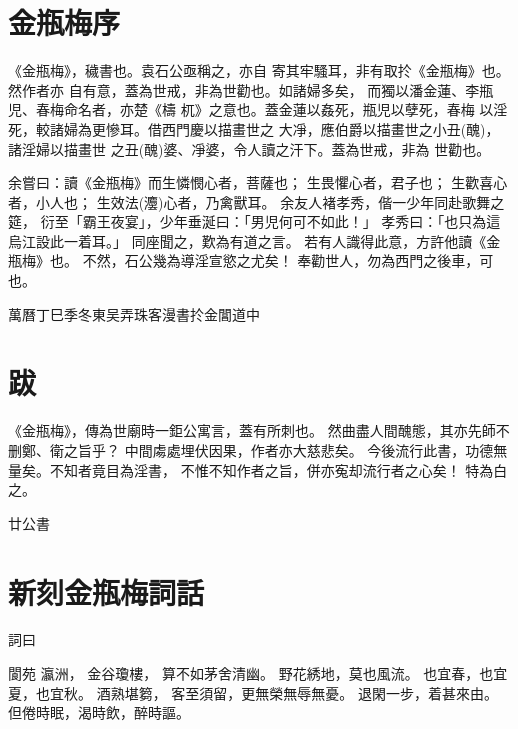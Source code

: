 \chapter*{金瓶梅序}

《金瓶梅》，穢書也。袁石公亟稱之，亦自
寄其牢騷耳，非有取扵《金瓶梅》也。然作者亦
自有意，蓋為世戒，非為世勸也。如諸婦多矣，
而獨以潘金蓮、李瓶児、春梅命名者，亦楚《檮
杌》之意也。蓋金蓮以姦死，瓶児以孽死，春梅
以淫死，較諸婦為更慘耳。借西門慶以描畫世之
大凈，應伯爵以描畫世之小丑(醜)，諸淫婦以描畫世
之丑(醜)婆、凈婆，令人讀之汗下。蓋為世戒，非為
世勸也。

余嘗曰：讀《金瓶梅》而生憐憫心者，菩薩也；
生畏懼心者，君子也；
生歡喜心者，小人也；
生效法(灋)心者，乃禽獸耳。
余友人褚孝秀，偕一少年同赴歌舞之筵，
衍至「霸王夜宴」，少年垂涎曰：「男児何可不如此！」
孝秀曰：「也只為這烏江設此一着耳。」
同座聞之，歎為有道之言。
若有人識得此意，方許他讀《金瓶梅》也。
不然，石公幾為導淫宣慾之尤矣！
奉勸世人，勿為西門之後車，可也。

{\bigskip\mbox{}\fzqiti\large\hfill 萬曆丁巳季冬東吴弄珠客漫書扵金閶道中 \quad}







\chapter*{跋}

《金瓶梅》，傳為世廟時一鉅公寓言，蓋有所刺也。
然曲盡人間醜態，其亦先師不删鄭、衛之旨乎？
中間䖏處埋伏因果，作者亦大慈悲矣。
今後流行此書，功德無量矣。不知者竟目為淫書，
不惟不知作者之旨，併亦寃却流行者之心矣！
特為白之。

{\bigskip\mbox{}\fzqiti\large\hfill 廿公書 \quad}





\chapter*{新刻金瓶梅詞話}

詞曰

閬苑
瀛洲，
金谷瓊樓， 算不如茅舍清幽。
野花綉地，莫也風流。
也宜春，也宜夏，也宜秋。
酒熟堪篘，%
客至須留，更無榮無辱無憂。
退閑一步，着甚來由。
但倦時眠，渴時飲，醉時謳。

